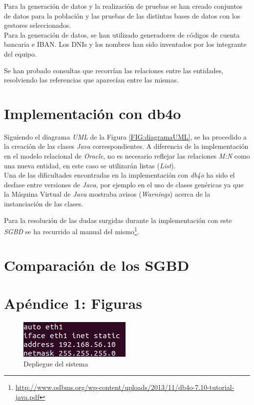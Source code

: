 \documentclass{article}
\begin{document}
Para la generación de datos y la realización de pruebas se han creado conjuntos de datos para la población y las pruebas de las distintas bases de datos con los gestores seleccionados.\\

Para la generación de datos, se han utilizado generadores de códigos de cuenta bancaria e IBAN. Los DNIs y los nombres han sido inventados por los integrante del equipo.

Se han probado consultas que recorrían las relaciones entre las entidades, resolviendo las referencias que aparecían entre las mismas.

\section{Implementación con db4o}

Siguiendo el diagrama \emph{UML} de la Figura \ref{FIG:diagramaUML}, se ha procedido a la creación de las clases \emph{Java} correspondientes. A diferencia de la implementación en el modelo relacional de \emph{Oracle}, no es necesario reflejar las relaciones \emph{M:N} como una nueva entidad, en este caso se utilizarán listas (\emph{List}).\\

Una de las dificultades encontradas en la implementación con \emph{db4o} ha sido el desfase entre versiones de \emph{Java}, por ejemplo en el uso de clases genéricas ya que la Máquina Virtual de \emph{Java} mostraba avisos (\emph{Warnings}) acerca de la instanciación de las clases.

Para la resolución de las dudas surgidas durante la implementación con este \emph{SGBD} se ha recurrido al manual del mismo\footnote{\url{http://www.odbms.org/wp-content/uploads/2013/11/db4o-7.10-tutorial-java.pdf}}.

\section{Comparación de los SGBD}

\section{Apéndice 1: Figuras}

\begin{figure}[h!]
	\centering
		\includegraphics[scale=1.5]{images/interfacesred.png}
			\caption{Depliegue del sistema}
		\label{FIG:interfacesRED}
\end{figure}
\end{document}
